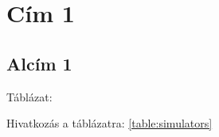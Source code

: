 \section{Cím 1}

\subsection{Alcím 1}

Táblázat: 



Hivatkozás a táblázatra: \ref{table:simulators}